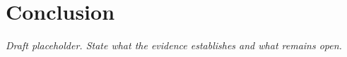 \section{Conclusion}
\label{sec:conclusion}
\emph{Draft placeholder. State what the evidence establishes and what remains open.}
